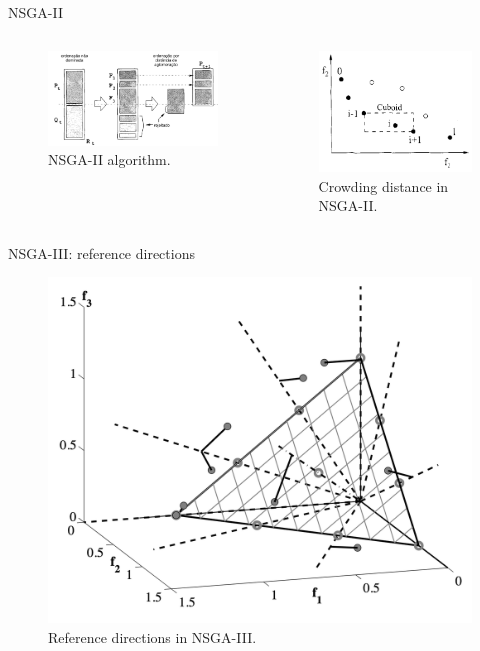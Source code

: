 \documentclass[aspectratio=169,xcolor=dvipsnames]{beamer}
\begin{document}
\begin{frame}{NSGA-II}
    \begin{columns}[c]
        \begin{figure}
            \centering
            \includegraphics[width=1\textwidth]{imgs/nsga-ii.png}
            \caption{NSGA-II algorithm.}
        \end{figure}

        \begin{figure}
            \centering
            \includegraphics[width=0.75\linewidth]{imgs/crowding-distance.png}
            \caption{Crowding distance in NSGA-II.}
        \end{figure}
    \end{columns}
\end{frame}


\begin{frame}{NSGA-III: reference directions}
    \begin{figure}
        \centering
        \includegraphics[width=.4\textwidth]{imgs/nsgaiii-crowding.png}
        \caption{Reference directions in NSGA-III.}
    \end{figure}

\end{frame}
\end{document}
